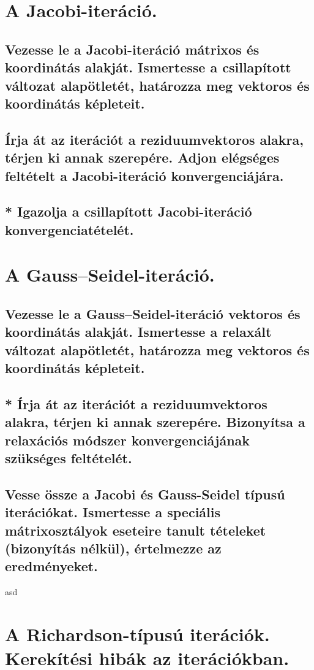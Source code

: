 \documentclass{article}
\begin{document}
    \section{A Jacobi-iteráció.}
        \subsection{Vezesse le a Jacobi-iteráció mátrixos és koordinátás alakját. Ismertesse a csillapított változat alapötletét, határozza meg vektoros és koordinátás képleteit.}
        \subsection{Írja át az iterációt a reziduumvektoros alakra, térjen ki annak szerepére. Adjon elégséges feltételt a Jacobi-iteráció konvergenciájára.}
        \subsection{* Igazolja a csillapított Jacobi-iteráció konvergenciatételét.}


    \section{A Gauss–Seidel-iteráció.}
        \subsection{Vezesse le a Gauss–Seidel-iteráció vektoros és koordinátás alakját. Ismertesse a relaxált változat alapötletét, határozza meg vektoros és koordinátás képleteit.}
        \subsection{* Írja át az iterációt a reziduumvektoros alakra, térjen ki annak szerepére. Bizonyítsa a relaxációs módszer konvergenciájának szükséges feltételét.}
        \subsection{Vesse össze a Jacobi és Gauss-Seidel típusú iterációkat. Ismertesse a speciális mátrixosztályok eseteire tanult tételeket (bizonyítás nélkül), értelmezze az eredményeket.}

asd
    \section{A Richardson-típusú iterációk. Kerekítési hibák az iterációkban.}
\end{document}
